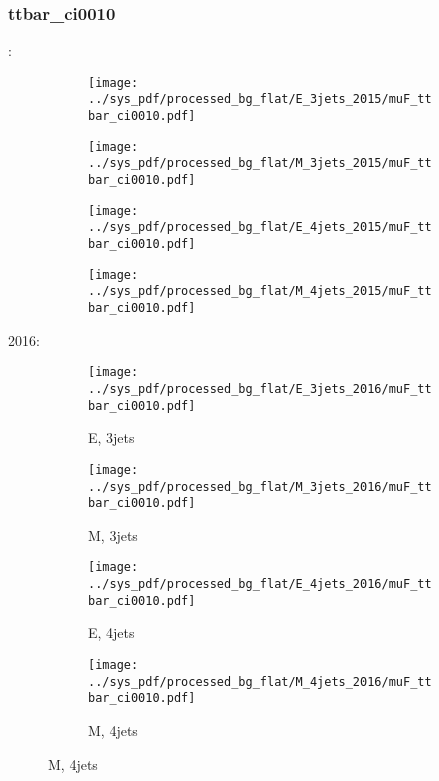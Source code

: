\documentclass{beamer}
\begin{document}
\begin{frame}
\frametitle{ttbar_ci0010}
\fontsize{5}{1}:
\begin{figure}
\centering
\begin{subfigure}[b]{0.24\textwidth}
\texttt{[image: ../sys\_pdf/processed\_bg\_flat/E\_3jets\_2015/muF\_ttbar\_ci0010.pdf]}
\end{subfigure}
\begin{subfigure}[b]{0.24\textwidth}
\texttt{[image: ../sys\_pdf/processed\_bg\_flat/M\_3jets\_2015/muF\_ttbar\_ci0010.pdf]}
\end{subfigure}
\begin{subfigure}[b]{0.24\textwidth}
\texttt{[image: ../sys\_pdf/processed\_bg\_flat/E\_4jets\_2015/muF\_ttbar\_ci0010.pdf]}
\end{subfigure}
\begin{subfigure}[b]{0.24\textwidth}
\texttt{[image: ../sys\_pdf/processed\_bg\_flat/M\_4jets\_2015/muF\_ttbar\_ci0010.pdf]}
\end{subfigure}
\end{figure}
2016:
\begin{figure}
\centering
\begin{subfigure}[b]{0.24\textwidth}
\texttt{[image: ../sys\_pdf/processed\_bg\_flat/E\_3jets\_2016/muF\_ttbar\_ci0010.pdf]}
\captionsetup{font=tiny}
\caption{E, 3jets}
\end{subfigure}
\begin{subfigure}[b]{0.24\textwidth}
\texttt{[image: ../sys\_pdf/processed\_bg\_flat/M\_3jets\_2016/muF\_ttbar\_ci0010.pdf]}
\captionsetup{font=tiny}
\caption{M, 3jets}
\end{subfigure}
\begin{subfigure}[b]{0.24\textwidth}
\texttt{[image: ../sys\_pdf/processed\_bg\_flat/E\_4jets\_2016/muF\_ttbar\_ci0010.pdf]}
\captionsetup{font=tiny}
\caption{E, 4jets}
\end{subfigure}
\begin{subfigure}[b]{0.24\textwidth}
\texttt{[image: ../sys\_pdf/processed\_bg\_flat/M\_4jets\_2016/muF\_ttbar\_ci0010.pdf]}
\captionsetup{font=tiny}
\caption{M, 4jets}
\end{subfigure}
\end{figure}
\end{frame}
\end{document}

